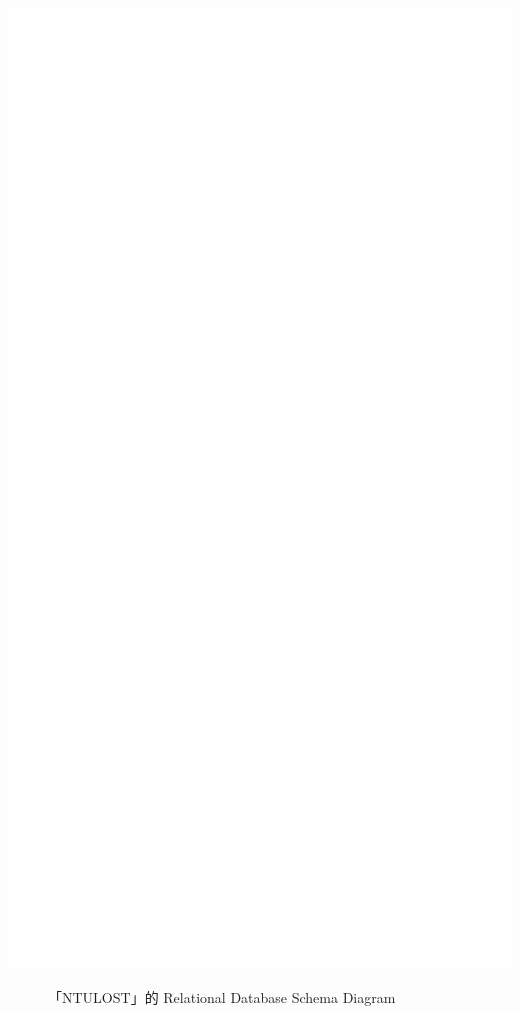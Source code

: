 \documentclass[12pt,a4paper]{article}
\begin{document}
\newpage
% 
\vspace*{-3.5cm}\includegraphics[scale=.7,page=2]{pre.pdf}
\vspace*{-2.3cm}
\begin{figure}[H]
    \caption{「NTULOST」的 Relational Database Schema Diagram}
    \label{fig:schemaDiagram}
\end{figure}
\newpage
\end{document}
